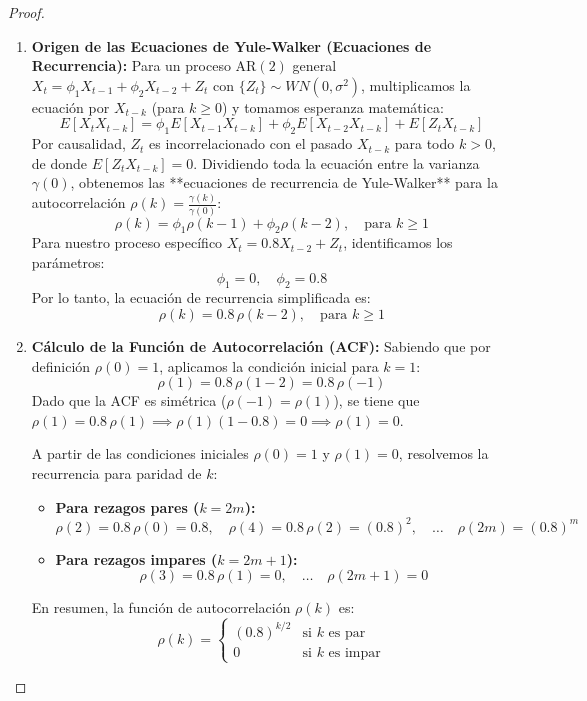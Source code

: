 \documentclass[11pt,letterpaper]{article}
\begin{document}
\begin{proof}
\begin{enumerate}
    \item \textbf{Origen de las Ecuaciones de Yule-Walker (Ecuaciones de Recurrencia):}
    Para un proceso $\text{AR}(2)$ general $X_t = \phi_1 X_{t-1} + \phi_2 X_{t-2} + Z_t$ con $\{Z_t\} \sim WN(0,\sigma^2)$, multiplicamos la ecuación por $X_{t-k}$ (para $k \ge 0$) y tomamos esperanza matemática:
    \[
    E[X_t X_{t-k}] = \phi_1 E[X_{t-1} X_{t-k}] + \phi_2 E[X_{t-2} X_{t-k}] + E[Z_t X_{t-k}]
    \]
    Por causalidad, $Z_t$ es incorrelacionado con el pasado $X_{t-k}$ para todo $k > 0$, de donde $E[Z_t X_{t-k}] = 0$. Dividiendo toda la ecuación entre la varianza $\gamma(0)$, obtenemos las **ecuaciones de recurrencia de Yule-Walker** para la autocorrelación $\rho(k) = \frac{\gamma(k)}{\gamma(0)}$:
    \[
    \rho(k) = \phi_1 \rho(k-1) + \phi_2 \rho(k-2), \quad \text{para } k \ge 1
    \]
    Para nuestro proceso específico $X_t = 0.8 X_{t-2} + Z_t$, identificamos los parámetros:
    \[
    \phi_1 = 0, \quad \phi_2 = 0.8
    \]
    Por lo tanto, la ecuación de recurrencia simplificada es:
    \[
    \rho(k) = 0.8 \, \rho(k-2), \quad \text{para } k \ge 1
    \]

    \item \textbf{Cálculo de la Función de Autocorrelación (ACF):}
    Sabiendo que por definición $\rho(0) = 1$, aplicamos la condición inicial para $k = 1$:
    \[
    \rho(1) = 0.8 \, \rho(1 - 2) = 0.8 \, \rho(-1)
    \]
    Dado que la ACF es simétrica ($\rho(-1) = \rho(1)$), se tiene que $\rho(1) = 0.8 \, \rho(1) \implies \rho(1)(1 - 0.8) = 0 \implies \rho(1) = 0$.

    A partir de las condiciones iniciales $\rho(0) = 1$ y $\rho(1) = 0$, resolvemos la recurrencia para paridad de $k$:
    \begin{itemize}
        \item \textbf{Para rezagos pares ($k = 2m$):}
        \[
        \rho(2) = 0.8 \, \rho(0) = 0.8, \quad \rho(4) = 0.8 \, \rho(2) = (0.8)^2, \quad \dots \quad \rho(2m) = (0.8)^m
        \]
        \item \textbf{Para rezagos impares ($k = 2m + 1$):}
        \[
        \rho(3) = 0.8 \, \rho(1) = 0, \quad \dots \quad \rho(2m+1) = 0
        \]
    \end{itemize}
    En resumen, la función de autocorrelación $\rho(k)$ es:
    \[
    \rho(k) = 
    \begin{cases} 
    (0.8)^{k/2} & \text{si } k \text{ es par} \\ 
    0 & \text{si } k \text{ es impar} 
    \end{cases}
    \]


\end{enumerate}
\end{proof}
\end{document}
